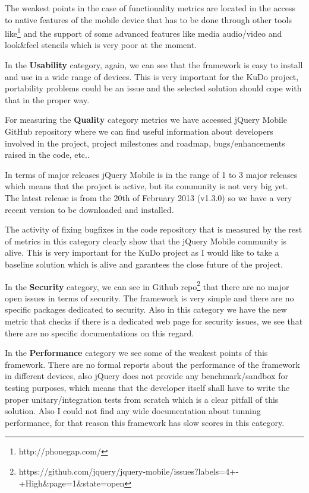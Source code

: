\documentclass[a4paper,12pt]{book}
\begin{document}
The weakest points in the case of functionality metrics are located in the access to native features of the mobile device that has to be done through other tools like\footnote{http://phonegap.com/} and the support of some advanced features like media audio/video and look\&feel stencils which is very poor at the moment.

In the \textbf{Usability} category, again, we can see that the framework is easy to install and use in a wide range of devices. This is very important for the KuDo project, portability problems could be an issue and the selected solution should cope with that in the proper way.

For measuring the \textbf{Quality} category metrics we have accessed jQuery Mobile GitHub repository\cite{jQuery Mobile Github repo} where we can find useful information about developers involved in the project, project milestones and roadmap, bugs/enhancements raised in the code, etc..

In terms of major releases jQuery Mobile is in the range of 1 to 3 major releases which means that the project is active, but its community is not very big yet. The latest release is from the 20th of February 2013 (v1.3.0) so we have a very recent version to be downloaded and installed.

The activity of fixing bugfixes in the code repository that is measured by the rest of metrics in this category clearly show that the jQuery Mobile community is alive. This is very important for the KuDo project as I would like to take a baseline solution which is alive and garantees the close future of the project.

In the \textbf{Security} category, we can see in Github repo\footnote{https://github.com/jquery/jquery-mobile/issues?labels=4+-+High\&page=1\&state=open}  that there are no major open issues in terms of security. The framework is very simple and there are no specific packages dedicated to security. Also in this category we have the new metric that checks if there is a dedicated web page for security issues, we see that there are no specific documentations on this regard.

In the \textbf{Performance} category we see some of the weakest points of this framework. There are no formal reports about the performance of the framework in different devices, also jQuery does not provide any benchmark/sandbox for testing purposes, which means that the developer itself shall have to write the proper unitary/integration tests from scratch which is a clear pitfall of this solution. Also I could not find any wide documentation about tunning performance, for that reason this framework has slow scores in this category.
\end{document}
